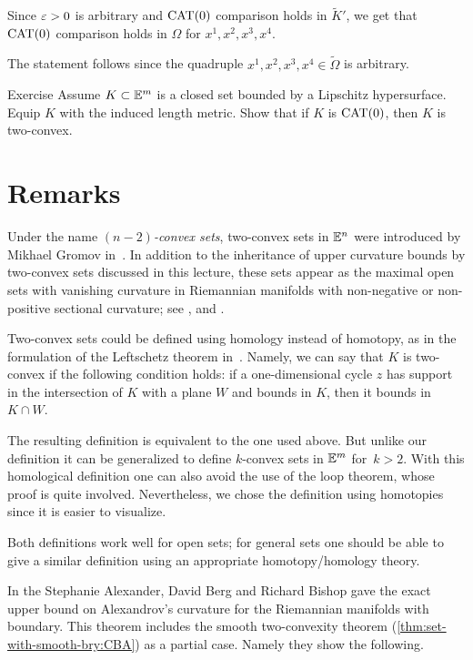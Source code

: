 Since $\varepsilon>0$ is arbitrary and $\mathrm{CAT}(0)$ comparison holds in $\tilde K'$,
we get that $\mathrm{CAT}(0)$ comparison holds in $\Omega$ for $x^1,x^2,x^3,x^4$.

The statement follows since the quadruple $x^1,x^2,x^3,x^4\in\tilde\Omega$ is arbitrary.
\qeds

\begin{thm}{Exercise}\label{ex:CAT=>two-convex}
Assume $K\subset\mathbb{E}^m$ is a closed set bounded by a Lipschitz hypersurface.
Equip $K$ with the induced length metric.
Show that if $K$ is $\mathrm{CAT}(0)$, then $K$ is two-convex.
\end{thm}




\section{Remarks}

Under the name \emph{$(n-2)$-convex sets}, 
two-convex sets in $\mathbb{E}^n$ were introduced by Mikhael Gromov in~\cite{gromov-1991}.
In addition to the inheritance of upper curvature bounds by two-convex sets discussed in this lecture, 
these sets appear as the maximal open sets with vanishing curvature in  Riemannian manifolds with non-negative or non-positive sectional curvature; see \cite[Lemma 5.8]{buyalo}, 
and \cite{panov-petrunin}.

Two-convex sets could be defined using homology instead of homotopy, as in the formulation of the Leftschetz theorem in~\cite[\S\textonehalf]{gromov-1991}.
Namely, we can say that $K$ is two-convex if the following condition holds: if a one-dimensional cycle $z$ has support in the intersection of $K$ with a plane $W$ and bounds in $K$, then it bounds in $K\cap W$.


The resulting definition is equivalent to the one used above.
But unlike our definition it can be generalized to define $k$-convex sets in $\mathbb{E}^m$ for~$k>2$.
With this homological definition one can also avoid the use of the loop theorem, whose proof is quite involved.
Nevertheless, we chose the definition using homotopies  since it is easier to visualize.


Both definitions work well for open sets; for general sets one should be able to give a similar definition using  an appropriate homotopy/ho\-mo\-logy theory.

In \cite{alexander-berg-bishop} the Stephanie Alexander, David Berg and Richard Bishop gave the exact upper bound on Alexandrov's curvature for the Riemannian manifolds with boundary.
This theorem includes the smooth two-convexity theorem (\ref{thm:set-with-smooth-bry:CBA}) as a partial case.
Namely they show the following.

